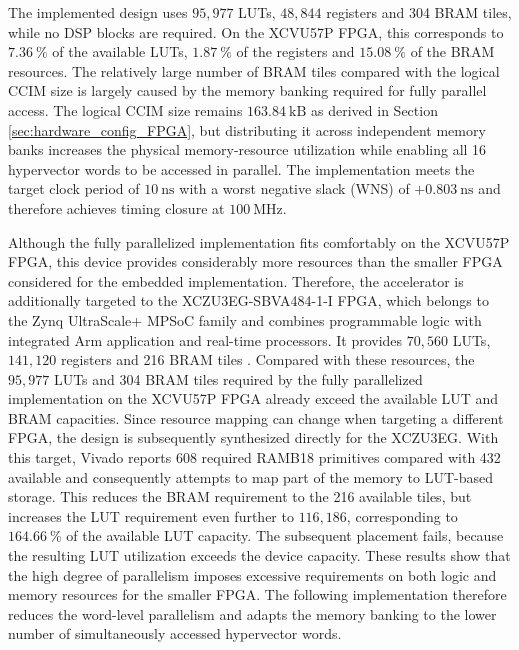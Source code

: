 The implemented design uses $95{,}977$ \acp{LUT}, $48{,}844$ registers and 304 \ac{BRAM} tiles, while no DSP blocks are required. On the XCVU57P FPGA, this corresponds to $7.36~\%$ of the available \acp{LUT}, $1.87~\%$ of the registers and $15.08~\%$ of the \ac{BRAM} resources. The relatively large number of \ac{BRAM} tiles compared with the logical CCIM size is largely caused by the memory banking required for fully parallel access. The logical \ac{CCIM} size remains $163.84~\mathrm{kB}$ as derived in Section \ref{sec:hardware_config_FPGA}, but distributing it across independent memory banks increases the physical memory-resource utilization while enabling all 16 hypervector words to be accessed in parallel. The implementation meets the target clock period of $10~\mathrm{ns}$ with a worst negative slack (WNS) of $+0.803~\mathrm{ns}$ and therefore achieves timing closure at $100~\mathrm{MHz}$.

Although the fully parallelized implementation fits comfortably on the XCVU57P FPGA, this device provides considerably more resources than the smaller FPGA considered for the embedded implementation. Therefore, the accelerator is additionally targeted to the XCZU3EG-SBVA484-1-I FPGA, which belongs to the Zynq UltraScale+ MPSoC family and combines programmable logic with integrated Arm application and real-time processors. It provides $70{,}560$ \acp{LUT}, $141{,}120$ registers and 216 \ac{BRAM} tiles \cite{amd_zynq_2025}. Compared with these resources, the $95{,}977$ \acp{LUT} and 304 \ac{BRAM} tiles required by the fully parallelized implementation on the XCVU57P FPGA already exceed the available LUT and BRAM capacities. Since resource mapping can change when targeting a different FPGA, the design is subsequently synthesized directly for the XCZU3EG. With this target, Vivado reports 608 required RAMB18 primitives compared with 432 available and consequently attempts to map part of the memory to LUT-based storage. This reduces the BRAM requirement to the 216 available tiles, but increases the LUT requirement even further to $116{,}186$, corresponding to $164.66~\%$ of the available LUT capacity. The subsequent placement fails, because the resulting LUT utilization exceeds the device capacity. These results show that the high degree of parallelism imposes excessive requirements on both logic and memory resources for the smaller FPGA. The following implementation therefore reduces the word-level parallelism and adapts the memory banking to the lower number of simultaneously accessed hypervector words.


